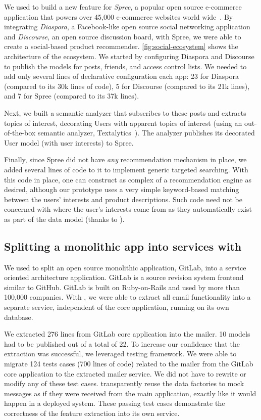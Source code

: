 We used \synapse to build a new feature for \emph{Spree}, a popular open source
e-commerce application that powers over 45,000 e-commerce websites world wide~\cite{spree-site}.
By integrating \emph{Diaspora}, a Facebook-like open source social networking
application and \emph{Discourse}, an open source discussion board, with Spree, we
were able to create a social-based product recommender.
\F\ref{fig:social-ecosystem} shows the architecture of the ecosystem.
We started by configuring Diaspora and Discourse to publish the models
for posts, friends, and access control lists.
We needed to add only several lines of declarative configuration each app: 23
for Diaspora (compared to its 30k lines of code), 5 for Discourse (compared to
its 21k lines), and 7 for Spree (compared to its 37k lines).

Next, we built a semantic analyzer that subscribes to these posts and extracts topics of interest, decorating Users with apparent topics of interest (using an out-of-the-box semantic analyzer, Textalytics~\cite{textalytics}).
The analyzer publishes its decorated {\code User} model (with user interests) to Spree.

Finally, since Spree did not have \emph{any} recommendation mechanism in place, we added several lines of code to it to implement generic targeted searching.
With this code in place, one can construct as complex of a recommendation engine as
desired, although our prototype uses a very simple keyword-based matching
between the users' interests and product descriptions. Such code need not be
concerned with where the user's interests come from as they
automatically exist as part of the data model (thanks to \synapse).

\subsection{Splitting a monolithic app into services with \synapse}
\label{synapse:sec:apps:gitlab}

We used \synapse to split an open source monolithic application, GitLab, into a
service oriented architecture application. GitLab is a source revision system
frontend similar to GitHub.  GitLab is built on Ruby-on-Rails and used by more
than 100,000 companies.  With \synapse, we were able to extract all email
functionality into a separate service, independent of the core application,
running on its own database.

We extracted 276 lines from GitLab core application into the mailer.  10 models
had to be published out of a total of 22.  To increase our confidence that the
extraction was successful, we leveraged \synapse testing framework. We were able
to migrate 124 tests cases (700 lines of code) related to the mailer from the
GitLab core application to the extracted mailer service.  We did not have to
rewrite or modify any of these test cases.  \synapse transparently reuse the
data factories to mock \synapse messages as if they were received from the main
application, exactly like it would happen in a deployed system. These passing
test cases demonstrate the correctness of the feature extraction into its own
service.

